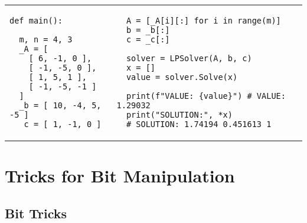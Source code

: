 \documentclass[letterpaper]{article}
\begin{document}
\begin{tabular}{@{}p{9cm}p{9cm}@{}}
    \begin{lstlisting}
def main():

  m, n = 4, 3
  _A = [
    [ 6, -1, 0 ],
    [ -1, -5, 0 ],
    [ 1, 5, 1 ],
    [ -1, -5, -1 ]
  ]
  _b = [ 10, -4, 5, -5 ]
  _c = [ 1, -1, 0 ]
\end{lstlisting}
     &
    \begin{lstlisting}
  A = [_A[i][:] for i in range(m)]
  b = _b[:]
  c = _c[:]

  solver = LPSolver(A, b, c)
  x = []
  value = solver.Solve(x)

  print(f"VALUE: {value}") # VALUE: 1.29032
  print("SOLUTION:", *x)
  # SOLUTION: 1.74194 0.451613 1
\end{lstlisting}
\end{tabular}

\clearpage

\section{Tricks for Bit Manipulation}

\subsection{Bit Tricks}

\end{document}
